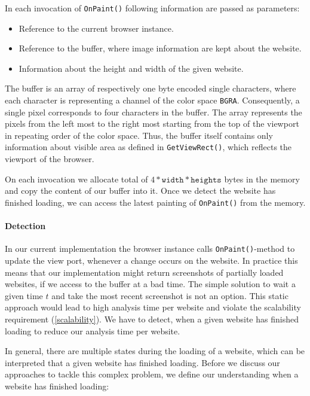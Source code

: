 In each invocation of \texttt{OnPaint()} following information are passed as parameters:

\begin{itemize}
\item Reference to the current browser instance.
\item Reference to the buffer, where image information are kept about the website.
\item Information about the height and width of the given website.
\end{itemize}

The buffer is an array of respectively one byte encoded single characters, where each character is representing a channel of the color space \texttt{BGRA}. Consequently, a single pixel corresponds to four characters in the buffer. The array represents the pixels from the left most to the right most starting from the top of the viewport in repeating order of the color space. Thus, the buffer itself contains only information about visible area as defined in \texttt{GetViewRect()}, which reflects the viewport of the browser.

On each invocation we allocate total of $4 * \texttt{width} * \texttt{heights}$ bytes in the memory and copy the content of our buffer into it. Once we detect the website has finished loading, we can access the latest painting of \texttt{OnPaint()} from the memory.

\paragraph{Detection}
In our current implementation the browser instance calls \texttt{OnPaint()}-method to update the view port, whenever a change occurs on the website. In practice this means that our implementation might return screenshots of partially loaded websites, if we access to the buffer at a bad time. The simple solution to wait a given time $t$ and take the most recent screenshot is not an option. This static approach would lead to high analysis time per website and violate the scalability requirement (\ref{scalability}). We have to detect, when a given website has finished loading to reduce our analysis time per website.

In general, there are multiple states during the loading of a website, which can be interpreted that a given website has finished loading. Before we discuss our approaches to tackle this complex problem, we define our understanding when a website has finished loading:

